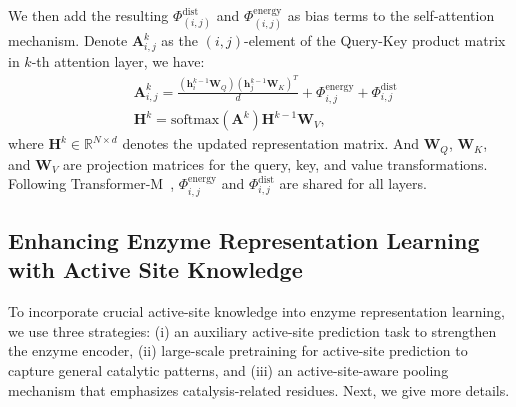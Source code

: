 We then add the resulting \(\Phi^{\mathrm{dist}}_{(i,j)}\) and \(\Phi^{\mathrm{energy}}_{(i,j)}\) as bias terms to the self-attention mechanism.  Denote $\mathbf{A}_{i,j}^k$ as the $(i, j)$-element of the Query-Key product matrix in $k$-th attention layer, we have:
\begin{equation}
\begin{aligned}
    & \mathbf{A}_{i,j}^{k}  = \frac{(\mathbf{h}_i^{k-1} \mathbf{W}_Q)(\mathbf{h}^{k-1}_j \mathbf{W}_K)^T}{d} + \Phi_{i,j}^{\mathrm{energy}} + \Phi_{i,j}^{\mathrm{dist}}\\
    & \mathbf{H}^{k}  = \mathrm{softmax}(\mathbf{A}^{k})\mathbf{H}^{k-1}\mathbf{W}_V,
    \label{eq:attention+DE}
\end{aligned}
\end{equation}
where $\mathbf{H}^k \in \mathbb{R}^{N \times d}$ denotes the updated representation matrix. And $\mathbf{W}_Q$, $\mathbf{W}_K$, and $\mathbf{W}_V$  are projection matrices for the query, key, and value transformations. 
Following Transformer-M~\cite{TransformerM}, $\Phi_{i,j}^{\mathrm{energy}}$ and $\Phi_{i,j}^{\mathrm{dist}}$ are shared for all layers.


\subsection{Enhancing Enzyme Representation Learning with Active Site Knowledge}
To incorporate crucial active-site knowledge into enzyme representation learning, we use three strategies: (i) an auxiliary active-site prediction task to strengthen the enzyme encoder, (ii) large-scale pretraining for active-site prediction to capture general catalytic patterns, and (iii) an active-site-aware pooling mechanism that emphasizes catalysis-related residues. Next, we give more details.



